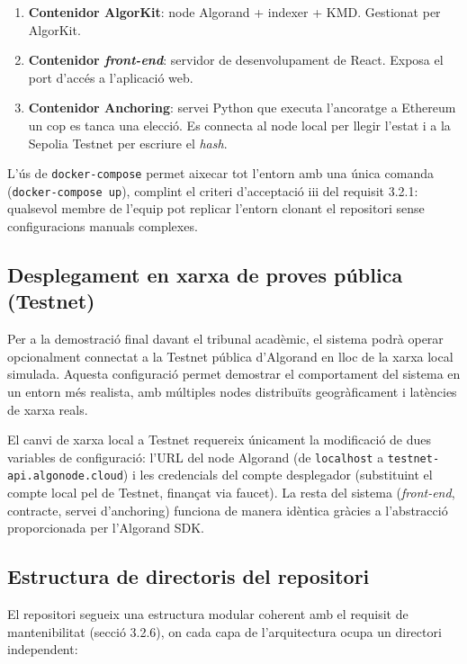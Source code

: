 \begin{enumerate}[label=\roman*.]
    \item \textbf{Contenidor AlgorKit}: node Algorand + indexer + KMD. Gestionat per AlgorKit.
    \item \textbf{Contenidor \textit{front-end}}: servidor de desenvolupament de React. Exposa el port d'accés a l'aplicació web.
    \item \textbf{Contenidor Anchoring}: servei Python que executa l'ancoratge a Ethereum un cop es tanca una elecció. Es connecta al node local per llegir l'estat i a la Sepolia Testnet per escriure el \textit{hash}.
\end{enumerate}
 
L'ús de \texttt{docker-compose} permet aixecar tot l'entorn amb una única comanda (\texttt{docker-compose up}), complint el criteri d'acceptació iii del requisit 3.2.1: qualsevol membre de l'equip pot replicar l'entorn clonant el repositori sense configuracions manuals complexes.
 
\subsection{Desplegament en xarxa de proves pública (Testnet)}
 
Per a la demostració final davant el tribunal acadèmic, el sistema podrà operar opcionalment connectat a la Testnet pública d'Algorand en lloc de la xarxa local simulada. Aquesta configuració permet demostrar el comportament del sistema en un entorn més realista, amb múltiples nodes distribuïts geogràficament i latències de xarxa reals.
 
El canvi de xarxa local a Testnet requereix únicament la modificació de dues variables de configuració: l'URL del node Algorand (de \texttt{localhost} a \texttt{testnet-api.algonode.cloud}) i les credencials del compte desplegador (substituint el compte local pel de Testnet, finançat via faucet). La resta del sistema (\textit{front-end}, contracte, servei d'anchoring) funciona de manera idèntica gràcies a l'abstracció proporcionada per l'Algorand SDK.
 
\subsection{Estructura de directoris del repositori}
 
El repositori segueix una estructura modular coherent amb el requisit de mantenibilitat (secció 3.2.6), on cada capa de l'arquitectura ocupa un directori independent:
 
